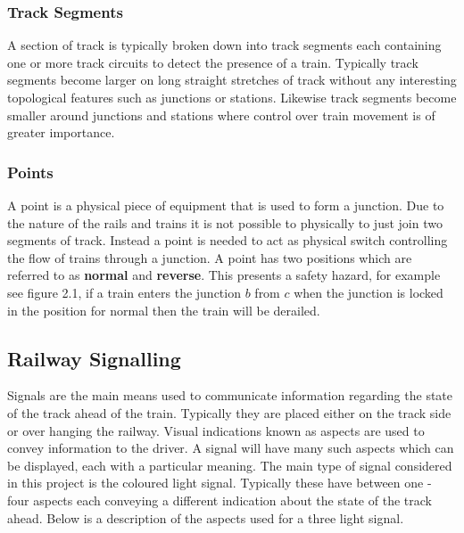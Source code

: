 \subsubsection{Track Segments}
A section of track is typically broken down into track segments each
containing one or more track circuits to detect the presence of a
train. Typically track segments become larger on long straight stretches of
track without any interesting topological features such as junctions or
stations. Likewise track segments become smaller around junctions and stations
where control over train movement is of greater importance. 

\subsubsection{Points}
A point is a physical piece of equipment that is used to 
form a junction. Due to the nature of the rails and trains it is not possible to physically
to just join two segments of track. Instead a point is needed to act as
physical switch controlling the flow of trains through a junction. A point
has two positions which are referred to as \textbf{normal} and
\textbf{reverse}. This presents a safety hazard, for example see figure 2.1, if a train enters
the junction $b$ from $c$ when the junction is locked in the
position for normal then the train will be derailed. 



\subsection{Railway Signalling}
Signals are the main means used to communicate information regarding the state
of the track ahead of the train. Typically they are placed either on the track
side or over hanging the railway. Visual indications known as aspects are used
to convey information to the driver. A signal will have many such aspects
which can be displayed, each with a particular meaning. The main type of signal
considered in this project is the coloured light signal. Typically these have
between one - four aspects each conveying a different indication about the state of
the track ahead. Below is a description of the
aspects used for a three light signal.  


